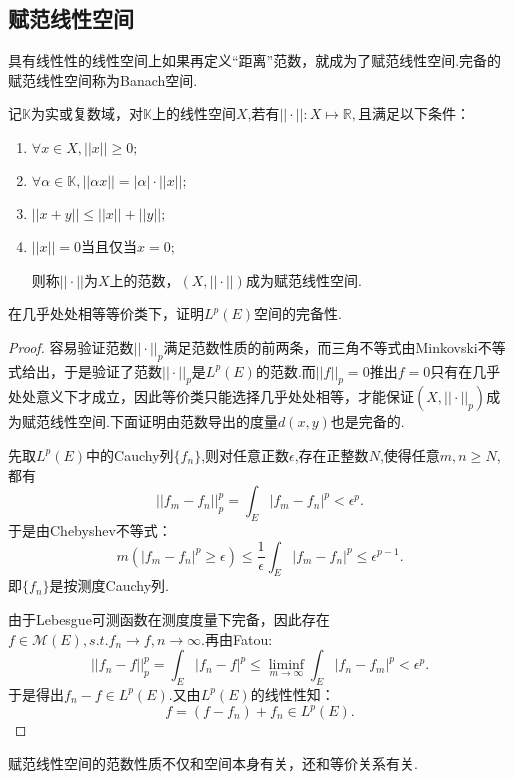 \documentclass[lang=cn,10pt]{elegantbook}
\begin{document}
	\subsection{赋范线性空间}
	具有线性性的线性空间上如果再定义“距离”范数，就成为了赋范线性空间.完备的赋范线性空间称为Banach空间.
	\begin{definition}[赋范线性空间]
		记$\mathbb{K}$为实或复数域，对$\mathbb{K}$上的线性空间\(X\),若有\(||\cdot||:X\longmapsto \mathbb{R},\)且满足以下条件：
		\begin{enumerate}
			\item \(\forall x \in X, ||x|| \ge 0;\)
			\item \(\forall \alpha \in \mathbb{K},||\alpha x||=|\alpha|\cdot||x||;\)
			\item \(||x+y||\le ||x||+||y||;\)
			\item \(||x||=0 \)当且仅当\(x=0;\)
			
			则称\(||\cdot||\)为\(X\)上的范数，\((X,||\cdot||)\)成为赋范线性空间.
		\end{enumerate}
	\end{definition}
	\begin{example}
		在几乎处处相等等价类下，证明\(L^p(E)\)空间的完备性.
		\begin{proof}
			容易验证范数\(||\cdot||_p\)满足范数性质的前两条，而三角不等式由Minkovski不等式给出，于是验证了范数\(||\cdot||_p\)是\(L^p(E)\)的范数.而\(||f||_p=0\)推出\(f=0\)只有在几乎处处意义下才成立，因此等价类只能选择几乎处处相等，才能保证\((X,||\cdot||_p)\)成为赋范线性空间.下面证明由范数导出的度量\(d(x,y)\)也是完备的.
			
			先取\(L^p(E)\)中的Cauchy列\(\{f_n\}\),则对任意正数\(\epsilon\),存在正整数\(N\),使得任意\(m,n\ge N\),都有
			\[||f_m-f_n||_p^p=\int_E |f_m-f_n|^p<\epsilon^p.\]
			于是由Chebyshev不等式：
			\[m(|f_m-f_n|^p\ge \epsilon)\le \frac{1}{\epsilon}\int_E |f_m-f_n|^p\le \epsilon^{p-1}.\]
			即\(\{f_n\}\)是按测度Cauchy列.
			
			由于Lebesgue可测函数在测度度量下完备，因此存在\(f\in \mathscr{M}(E),s.t.f_n\to f,n\to \infty.\)再由Fatou:
			\[||f_n-f||_p^p=\int_E |f_n-f|^p\le \liminf\limits_{m\to \infty}\int_E |f_n-f_m|^p<\epsilon^p.\]
			于是得出\(f_n-f\in L^p(E).\)又由\(L^p(E)\)的线性性知：
			\[f=(f-f_n)+f_n \in L^p(E).\]
		\end{proof}
	\end{example}
	\begin{note}
		赋范线性空间的范数性质不仅和空间本身有关，还和等价关系有关.
	\end{note}
\end{document}
